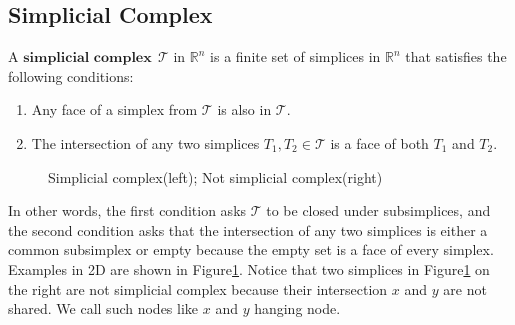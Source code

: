 \subsection{Simplicial Complex}
    \begin{definition*}
    A $\textbf{simplicial complex} ~~\mathcal T$ in $\mathbb{R}^n$ is a finite set of simplices in $\mathbb{R}^n$ that satisfies the following conditions:
    \begin{enumerate}[label =\arabic*.]
      \item Any face of a simplex from $\mathcal{T}$ is also in $\mathcal{T}$.
      \item The intersection of any two simplices ${T}_1, {T}_2 \in \mathcal{T}$ is a face of both ${T}_1$ and  ${T}_2$.
    \end{enumerate}
    \begin{figure}[b]
    \centering
    \caption{Simplicial complex(left); Not simplicial complex(right)}%
    \label{Fig2}
    \end{figure}
    \end{definition*}
    In other words, the first condition asks $\mathcal{T}$ to be closed under subsimplices, and the second condition asks that the intersection of any two simplices is either a common subsimplex or empty because the empty set is a face of every simplex. Examples in 2D are shown in Figure\ref{Fig2}. Notice that two simplices in Figure\ref{Fig2} on the right are not simplicial complex because their intersection $x$ and $y$ are not shared. We call such nodes like $x$ and $y$ hanging node.

